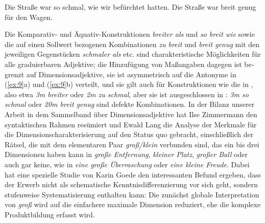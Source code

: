 \documentclass[output=paper,colorlinks,citecolor=brown]{langscibook}
\begin{document}
\begin{otherlanguage}{german}
\ea
\ea Die Straße war so schmal, wie wir befürchtet hatten. \label{ex:17a}
\ex Die Straße war breit genug für den Wagen. \label{ex:17b}
\z
\label{ex:17}
\z

\noindent Die Komparativ- und Äquativ-Konstruktionen \textit{breiter als} und \textit{so breit wie} sowie die auf einen Sollwert bezogenen Kombinationen \textit{zu breit} und \textit{breit genug} mit den jeweiligen Gegenstücken \textit{schmaler als} etc. sind charakteristische Möglichkeiten für alle graduierbaren Adjektive; die Hinzufügung von Maßangaben dagegen ist begrenzt auf Dimensionsadjektive, sie ist asymmetrisch auf die Antonyme in (\ref{ex:9}a) und (\ref{ex:9}b) verteilt, und sie gilt auch für Konstruktionen wie die in , also etwa \textit{3m breiter} oder \textit{2m zu schmal}, aber sie ist ausgeschlossen in : \textit{3m so schmal} oder \textit{20m breit genug} sind defekte Kombinationen. In der Bilanz unserer Arbeit in dem Sammelband über Dimensionsadjektive \citep{BierwischLang1987} hat Ilse Zimmermann den syntaktischen Rahmen resümiert und Ewald Lang die Analyse der Merkmale für die Dimensionscharakterisierung auf den Status quo gebracht, einschließlich der Rätsel, die mit dem elementaren Paar \textit{groß/klein} verbunden sind, das ein bis drei Dimensionen haben kann in \textit{große Entfernung}, \textit{kleiner Platz}, \textit{großer Ball} oder auch gar keine, wie in \textit{eine große Überraschung} oder \textit{eine kleine Freude}. Dabei hat eine spezielle Studie von Karin Goede \citep{Goede1987} den in\-te\-res\-san\-ten Befund ergeben, dass der Erwerb nicht als schematische Kenntnisdifferenzierung vor sich geht, sondern stufenweise Systematisierung enthalten kann: Die zunächst globale Interpretation von \textit{groß} wird auf die einfachere maximale Dimension reduziert, ehe die komplexe Produktbildung erfasst wird.


\end{otherlanguage}
\end{document}
